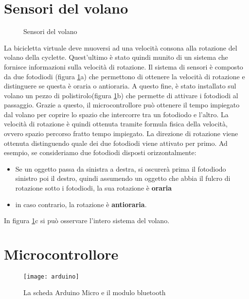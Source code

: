 \section{Sensori del volano}
\begin{figure}%

    \centering
    \caption{Sensori del volano}%
    \label{volano}
\end{figure}
La bicicletta virtuale deve muoversi ad una velocità consona alla rotazione del volano della cyclette. Quest'ultimo è stato quindi munito di un sistema che fornisce informazioni sulla velocità di rotazione. Il sistema di sensori è composto da due fotodiodi (figura \ref{volano}a) che permettono di ottenere la velocità di rotazione e distinguere se questa è oraria o antioraria. A questo fine, è stato installato sul volano un pezzo di polistirolo(figura \ref{volano}b) che permette di attivare i fotodiodi al passaggio. Grazie a questo, il microcontrollore può ottenere il tempo impiegato dal volano per coprire lo spazio che intercorre tra un fotodiodo e l'altro. La velocità di rotazione è quindi ottenuta tramite formula fisica della velocità, ovvero spazio percorso fratto tempo impiegato. La direzione di rotazione viene ottenuta distinguendo quale dei due fotodiodi viene attivato per primo. Ad esempio, se consideriamo due fotodiodi disposti orizzontalmente:\\
\begin{itemize}
  \item Se un oggetto passa da sinistra a destra, si oscurerà prima il fotodiodo sinistro poi il destro, quindi assumendo un oggetto che abbia il fulcro di rotazione sotto i fotodiodi, la sua rotazione è \textbf{oraria}
  \item in caso contrario, la rotazione è \textbf{antioraria}.
\end{itemize}
In figura \ref{volano}c si può osservare l'intero sistema del volano.

\section{Microcontrollore}
\begin{wrapfigure}{r}{0.4\textwidth} %
    \centering
    \vspace{-1.3cm}
    \texttt{[image: arduino]}
    \caption{La scheda Arduino Micro e il modulo bluetooth}
    \vspace{-1.3cm}
\end{wrapfigure}

